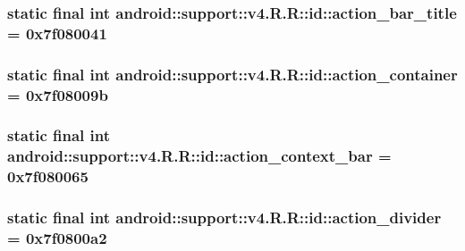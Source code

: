\hypertarget{classandroid_1_1support_1_1v4_1_1_r_1_1id_bb51cf626ce834b5ed42932e1812c753}{
\subsubsection[{action\_\-bar\_\-title}]{\setlength{\rightskip}{0pt plus 5cm}static final int android::support::v4.R.R::id::action\_\-bar\_\-title = 0x7f080041}}
\label{classandroid_1_1support_1_1v4_1_1_r_1_1id_bb51cf626ce834b5ed42932e1812c753}


\hypertarget{classandroid_1_1support_1_1v4_1_1_r_1_1id_388faa3649b5141f6a7d638739918b46}{
\subsubsection[{action\_\-container}]{\setlength{\rightskip}{0pt plus 5cm}static final int android::support::v4.R.R::id::action\_\-container = 0x7f08009b}}
\label{classandroid_1_1support_1_1v4_1_1_r_1_1id_388faa3649b5141f6a7d638739918b46}


\hypertarget{classandroid_1_1support_1_1v4_1_1_r_1_1id_590087337710e8c4e80eeb581f61b516}{
\subsubsection[{action\_\-context\_\-bar}]{\setlength{\rightskip}{0pt plus 5cm}static final int android::support::v4.R.R::id::action\_\-context\_\-bar = 0x7f080065}}
\label{classandroid_1_1support_1_1v4_1_1_r_1_1id_590087337710e8c4e80eeb581f61b516}


\hypertarget{classandroid_1_1support_1_1v4_1_1_r_1_1id_5139aee4c3b9250e20f3fccb1ada8a58}{
\subsubsection[{action\_\-divider}]{\setlength{\rightskip}{0pt plus 5cm}static final int android::support::v4.R.R::id::action\_\-divider = 0x7f0800a2}}
\label{classandroid_1_1support_1_1v4_1_1_r_1_1id_5139aee4c3b9250e20f3fccb1ada8a58}


